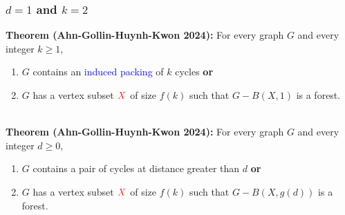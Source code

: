 \documentclass{beamer}
\begin{document}
\begin{frame}
\begin{center}
    \end{center}
\end{frame}

\begin{frame}
  \frametitle{$d=1$ and $k=2$}


  \noindent\textbf{Theorem (Ahn-Gollin-Huynh-Kwon 2024):} For every graph $G$ and every integer $k\ge 1$,
  \begin{enumerate}%
    \item $G$ contains an \textcolor{blue}{induced packing} of $k$ cycles \textbf{or}
    \item $G$ has a vertex subset $\mathcolor{red}{X}$ of size $f(k)$ such that $G-B(X,1)$ is a forest.
  \end{enumerate}
  \\[2ex]
  \noindent\textbf{Theorem (Ahn-Gollin-Huynh-Kwon 2024):} For every graph $G$ and every integer $d\ge 0$,
  \begin{enumerate}%
    \item $G$ contains a pair of cycles at distance greater than $d$ \textbf{or}
    \item $G$ has a vertex subset $\mathcolor{red}{X}$ of size $f(k)$ such that $G-B(X,g(d))$ is a forest.
  \end{enumerate}
\end{frame}
\end{document}
